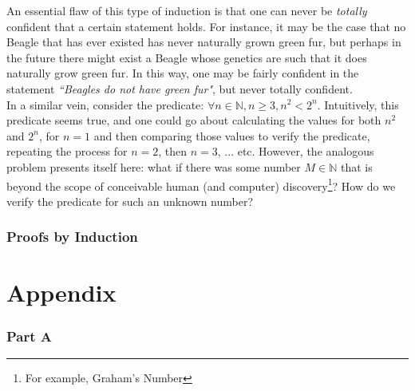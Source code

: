 \documentclass[10pt,a4paper,fleqn]{article}
\begin{document}
	An essential flaw of this type of induction is that one can never be \emph{totally} confident that a certain statement holds. For instance, it may be the case that no Beagle that has ever existed has never naturally grown green fur, but perhaps in the future there might exist a Beagle whose genetics are such that it does naturally grow green fur. In this way, one may be fairly confident in the statement \emph{``Beagles do not have green fur"}, but never totally confident. \\
	
	 In a similar vein, consider the predicate: $\forall n \in \mathbb{N}, n \geq 3, n^2 < 2^n$. Intuitively, this predicate seems true, and one could go about calculating the values for both $n^2$ and $2^n$, for $n = 1$ and then comparing those values to verify the predicate, repeating the process for $n=2$, then $n=3$, ... etc. However, the analogous problem presents itself here: what if there was some number $M \in \mathbb{N}$ that is beyond the scope of conceivable human (and computer) discovery\footnote{For example, Graham's Number}? How do we verify the predicate for such an unknown number?
	 
	\section{Proofs by Induction}
	\newpage
	
	\part{Appendix}
		\section{Part A}
	
\end{document}
